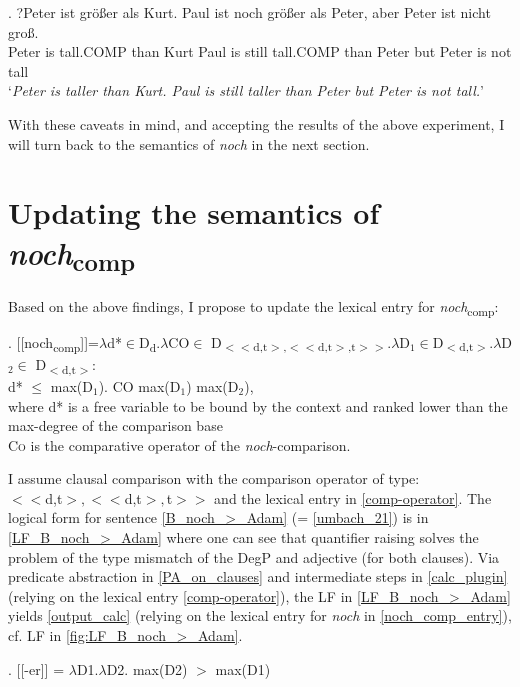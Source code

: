\documentclass[output=paper,
modfonts
]{langscibook}
\begin{document}
\exg. ?Peter ist größer als Kurt. Paul ist noch größer als Peter, aber Peter ist nicht groß.\\
Peter is tall.COMP than Kurt Paul is still tall.COMP than Peter but Peter is not tall\\
`\textit{Peter is taller than Kurt. Paul is still taller than Peter but Peter is not tall.}' \label{comp_additional_comp_NOCH}

With these caveats in mind, and accepting the results of the above experiment, I will turn back to the semantics of \textit{noch} in the next section.

\section{Updating the semantics of \textit{noch}\textsubscript{comp}}\label{sec_semantics_update}

Based on the above findings, I propose to update the lexical entry for \textit{noch}\textsubscript{comp}:

\ex. [[noch\textsubscript{comp}]]=$\lambda$d*$\in$D\textsubscript{d}.$\lambda$\textsc{CO}$\in$ D\textsubscript{$<<$d,t$>$,$<<$d,t$>$,t$>>$}.$\lambda$D$_{1}$$\in$D\textsubscript{$<$d,t$>$}.$\lambda$D$_{2}$$\in$ D\textsubscript{$<$d,t$>$}:\\d* $\leq$ max(D$_1$). \textsc{CO} max(D$_1$) max(D$_2$),\\ where d* is a free variable to be bound by the context and ranked lower than the max-degree of the comparison base \\\textsc{Co} is the comparative operator of the \textit{noch}-comparison. \label{noch_comp_entry} 

I assume clausal comparison with the comparison operator of type:\\ \mbox{$<<$d,t$>,<<$d,t$>,$t$>>$} \citep[cf.][]{Beck2011} and the lexical entry in \ref{comp-operator}. The logical form for sentence \ref{B_noch_>_Adam} (= \ref{umbach_21}) is in \ref{LF_B_noch_>_Adam} where one can see that quantifier raising solves the problem of the type mismatch of the DegP and adjective (for both clauses). Via predicate abstraction in \ref{PA_on_clauses} and intermediate steps in \ref{calc_plugin}(relying on the lexical entry \ref{comp-operator}), the LF in \ref{LF_B_noch_>_Adam} yields \ref{output_calc} (relying on the lexical entry for \textit{noch} in \ref{noch_comp_entry}), cf. LF in \ref{fig:LF_B_noch_>_Adam}.

\ex. [[-er]] = $\lambda$D1.$\lambda$D2. max(D2) $>$ max(D1) \label{comp-operator}
\end{document}
